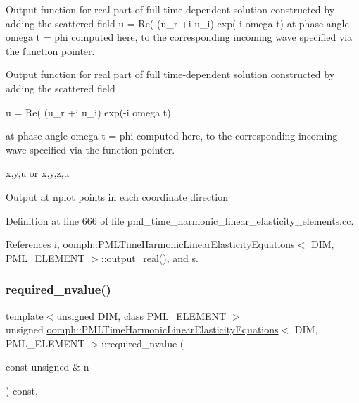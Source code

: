 Output function for real part of full time-\/dependent solution constructed by adding the scattered field u = Re( (u\+\_\+r +i u\+\_\+i) exp(-\/i omega t) at phase angle omega t = phi computed here, to the corresponding incoming wave specified via the function pointer.

Output function for real part of full time-\/dependent solution constructed by adding the scattered field

u = Re( (u\+\_\+r +i u\+\_\+i) exp(-\/i omega t)

at phase angle omega t = phi computed here, to the corresponding incoming wave specified via the function pointer.

x,y,u or x,y,z,u

Output at nplot points in each coordinate direction 

Definition at line 666 of file pml\+\_\+time\+\_\+harmonic\+\_\+linear\+\_\+elasticity\+\_\+elements.\+cc.



References i, oomph\+::\+P\+M\+L\+Time\+Harmonic\+Linear\+Elasticity\+Equations$<$ D\+I\+M, P\+M\+L\+\_\+\+E\+L\+E\+M\+E\+N\+T $>$\+::output\+\_\+real(), and s.

\mbox{\label{classoomph_1_1PMLTimeHarmonicLinearElasticityEquations_a717fe9dac9457f652bb49872648525eb}} 
\subsubsection{\texorpdfstring{required\+\_\+nvalue()}{required\_nvalue()}}
{\footnotesize\ttfamily template$<$unsigned D\+IM, class P\+M\+L\+\_\+\+E\+L\+E\+M\+E\+NT $>$ \\
unsigned \hyperlink{classoomph_1_1PMLTimeHarmonicLinearElasticityEquations}{oomph\+::\+P\+M\+L\+Time\+Harmonic\+Linear\+Elasticity\+Equations}$<$ D\+IM, P\+M\+L\+\_\+\+E\+L\+E\+M\+E\+NT $>$\+::required\+\_\+nvalue (\begin{DoxyParamCaption}\item[{const unsigned \&}]{n }\end{DoxyParamCaption}) const\hspace{0.3cm}{\ttfamily [inline]}, {\ttfamily [virtual]}}



